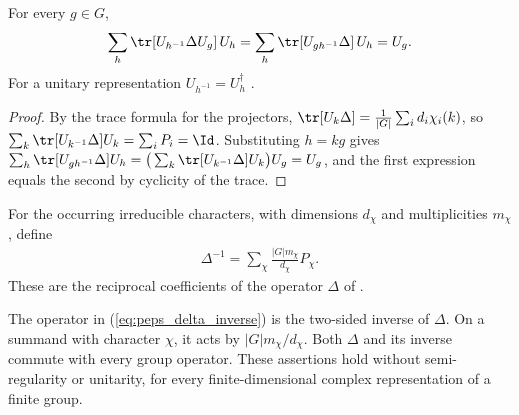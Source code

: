 \begin{lemma}%
    \label{thm:peps_delta_expansion}
    \leanok
    For every $g\in G$,
    \begin{align*}
        \sum_h\tr[U_{h^{-1}}\Delta U_g]\,U_h
        =\sum_h\tr[U_{gh^{-1}}\Delta]\,U_h=U_g .
    \end{align*}
    For a unitary representation $U_{h^{-1}}=U_h^\dagger$
    \cite[Lemma~4.4]{Schuch2010PEPS}.
\end{lemma}

\begin{proof}\leanok
    By the trace formula for the projectors,
    $\tr[U_k\Delta]=\frac{1}{|G|}\sum_i d_i\chi_i(k)$, so
    $\sum_k\tr[U_{k^{-1}}\Delta]U_k=\sum_iP_i=\Id$. Substituting
    $h=kg$ gives
    $\sum_h\tr[U_{gh^{-1}}\Delta]U_h=\big(\sum_k\tr[U_{k^{-1}}\Delta]U_k\big)U_g
        =U_g$, and the first expression equals the second by cyclicity of
    the trace.
\end{proof}

\begin{definition}
    \label{def:peps_delta_inverse}
    \leanok
    For the occurring irreducible characters, with dimensions $d_\chi$
    and multiplicities $m_\chi$, define
    \begin{align}
        \Delta^{-1}=\sum_\chi\frac{|G|m_\chi}{d_\chi}P_\chi.
        \label{eq:peps_delta_inverse}
    \end{align}
    These are the reciprocal coefficients of the operator $\Delta$
    of \cite[Lemma~4.4]{Schuch2010PEPS}.
\end{definition}

\begin{lemma}
    \label{thm:peps_delta_inverse}
    \leanok
    The operator in (\ref{eq:peps_delta_inverse}) is the two-sided inverse
    of $\Delta$. On a summand with character $\chi$, it acts by
    $|G|m_\chi/d_\chi$. Both $\Delta$ and its inverse commute with every
    group operator. These assertions hold without semi-regularity or
    unitarity, for every finite-dimensional complex representation of a
    finite group.
\end{lemma}

